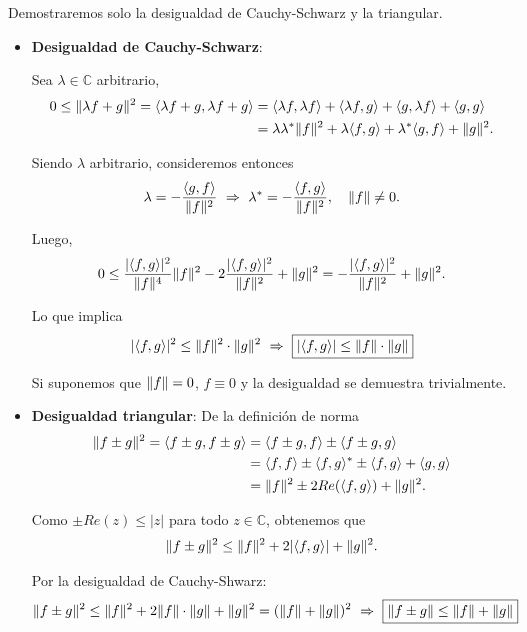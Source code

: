 \begin{demo}
Demostraremos solo la desigualdad de Cauchy-Schwarz y la triangular.

\begin{itemize}
    \item \textbf{Desigualdad de Cauchy-Schwarz}:
    
    Sea $\lambda \in \mathbb{C}$ arbitrario,
\begin{align*}
0 \leq \lVert\lambda f + g\rVert^2 = \langle \lambda f + g , \lambda f + g\rangle &= \langle \lambda f , \lambda f \rangle + \langle \lambda f , g \rangle + \langle g, \lambda f \rangle + \langle g , g \rangle \\
&= \lambda \lambda^* \lVert f\rVert^2 + \lambda \langle f,g\rangle + \lambda^* \langle g,f\rangle + \lVert g\rVert^2.
\end{align*}

Siendo $\lambda$ arbitrario, consideremos entonces
\begin{equation*}
    \lambda = - \frac{\langle g,f \rangle}{\lVert f\rVert^2} ~\Rightarrow~ \lambda^* = - \frac{\langle f,g\rangle}{\lVert f\rVert^2}, \quad \lVert f\rVert \neq 0.
\end{equation*}

Luego, 
$$0 \leq \frac{|\langle f, g \rangle|^2}{\lVert f\rVert^4} \lVert f\rVert^2 - 2 \frac{|\langle f,g \rangle|^2}{\lVert f\rVert^2} + \lVert g\rVert^2 = -\frac{|\langle f,g \rangle|^2}{\lVert f\rVert^2} + \lVert g\rVert^2. $$

Lo que implica 
$$|\langle f,g \rangle|^2 \leq \lVert f\rVert^2 \cdot \lVert g\rVert^2 ~\Rightarrow~ \boxed{|\langle f , g \rangle| \leq \lVert f\rVert \cdot \lVert g\rVert}$$

Si suponemos que $\lVert f\rVert = 0$, $f \equiv 0$ y la desigualdad se demuestra trivialmente.

 \item \textbf{Desigualdad triangular}: De la definición de norma
 \begin{align*}
     \lVert f\pm g\rVert^2 = \langle  f \pm g , f \pm g \rangle &= \langle f \pm g , f \rangle \pm \langle f \pm g , g\rangle \\
     &= \langle f,f \rangle \pm \langle f , g \rangle^* \pm \langle f,g \rangle +  \langle g,g \rangle \\
     &= \lVert f\rVert^2 \pm 2 Re(\langle f,g \rangle) + \lVert g\rVert^2.
 \end{align*}
 
 Como $\pm Re(z) \leq |z|$ para todo $z \in \mathbb{C}$, obtenemos que 
 $$\lVert f\pm g\rVert^2 \leq \lVert f\rVert^2+ 2 |\langle f,g \rangle| + \lVert g\rVert^2.$$
 
 Por la desigualdad de  Cauchy-Shwarz:
 $$\lVert f\pm g\rVert^2 \leq \lVert f\rVert^2 + 2 \lVert f\rVert \cdot \lVert g\rVert + \lVert g\rVert^2 = (\lVert f\rVert + \lVert g\rVert)^2 ~\Rightarrow~ \boxed{\lVert f \pm g\rVert \leq \lVert f\rVert + \lVert g\rVert}$$
\end{itemize}


\end{demo}

